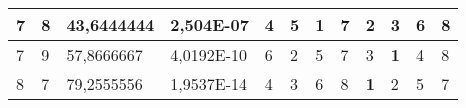 \documentclass[conference]{IEEEtran}
\begin{document}
\begin{table*}[]
\begin{tabular}{|llll|llllllll|}
\multicolumn{1}{|l|}{7}                                                     & \multicolumn{1}{l|}{8}                                                        & \multicolumn{1}{l|}{43,6444444}                                                   & 2,504E-07                      & \multicolumn{1}{l|}{4}                                                  & \multicolumn{1}{l|}{5}                                                  & \multicolumn{1}{l|}{\textbf{1}}                                         & \multicolumn{1}{l|}{7}                                                  & \multicolumn{1}{l|}{2}                                                  & \multicolumn{1}{l|}{3}                                                  & \multicolumn{1}{l|}{6}                                                  & 8                          \\ \hline
\multicolumn{1}{|l|}{7}                                                     & \multicolumn{1}{l|}{9}                                                        & \multicolumn{1}{l|}{57,8666667}                                                   & 4,0192E-10                     & \multicolumn{1}{l|}{6}                                                  & \multicolumn{1}{l|}{2}                                                  & \multicolumn{1}{l|}{5}                                                  & \multicolumn{1}{l|}{7}                                                  & \multicolumn{1}{l|}{3}                                                  & \multicolumn{1}{l|}{\textbf{1}}                                         & \multicolumn{1}{l|}{4}                                                  & 8                          \\ \hline
\multicolumn{1}{|l|}{8}                                                     & \multicolumn{1}{l|}{7}                                                        & \multicolumn{1}{l|}{79,2555556}                                                   & 1,9537E-14                     & \multicolumn{1}{l|}{4}                                                  & \multicolumn{1}{l|}{3}                                                  & \multicolumn{1}{l|}{6}                                                  & \multicolumn{1}{l|}{8}                                                  & \multicolumn{1}{l|}{\textbf{1}}                                         & \multicolumn{1}{l|}{2}                                                  & \multicolumn{1}{l|}{5}                                                  & 7                          \\ \hline

\end{tabular}
\end{table*}
\end{document}
